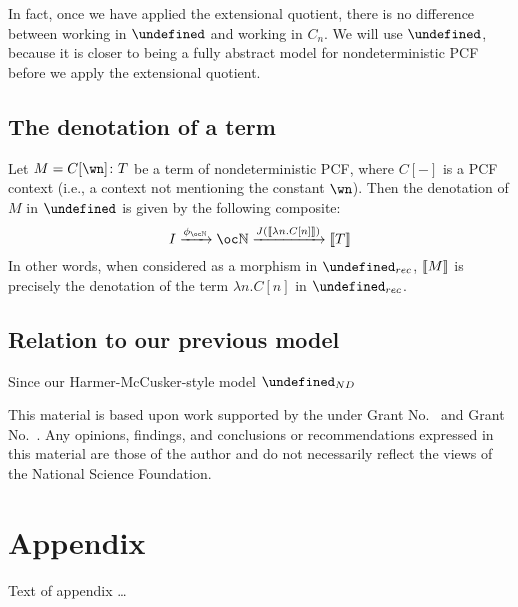 \documentclass[sigplan,10pt,review]{acmart}\settopmatter{printfolios=true,printccs=false,printacmref=false}
\let\G\undefined
\let\C\undefined
\begin{document}
In fact, once we have applied the extensional quotient, there is no difference between working in $\C$ and working in $C_n$.  
We will use $\C$, because it is closer to being a fully abstract model for nondeterministic PCF before we apply the extensional quotient.

\subsection{The denotation of a term}

Let $M=C[\wn]\from T$ be a term of nondeterministic PCF, where $C[-]$ is a PCF context (i.e., a context not mentioning the constant $\wn$).  
Then the denotation of $M$ in $\C$ is given by the following composite:
\[
  I \xrightarrow{\phi_{\oc\bN}}
  \oc \bN \xrightarrow{J (\deno{\lambda n. C[n]})}
  \deno{T}
  \]
In other words, when considered as a morphism in $\G_{rec}$, $\left\llbracket M\right\rrbracket$ is precisely the denotation of the term $\lambda n.C[n]$ in $\G_{rec}$.  

\subsection{Relation to our previous model}

Since our Harmer-McCusker-style model $\G_{ND}$

\begin{acks}                            %
  This material is based upon work supported by the
   under Grant
  No.~ and Grant
  No.~.  Any opinions, findings, and
  conclusions or recommendations expressed in this material are those
  of the author and do not necessarily reflect the views of the
  National Science Foundation.
\end{acks}





\appendix
\section{Appendix}

Text of appendix \ldots
\end{document}
